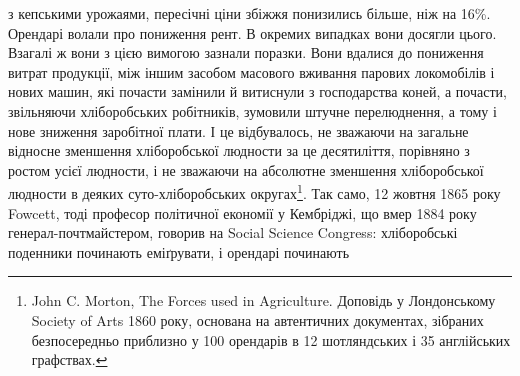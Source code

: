 з кепськими урожаями, пересічні ціни збіжжя понизились більше, ніж на 16\%.
Орендарі волали про пониження рент. В окремих випадках вони досягли цього.
Взагалі ж вони з цією вимогою зазнали поразки. Вони вдалися до пониження
витрат продукції, між іншим засобом масового вживання парових
локомобілів і нових машин, які почасти замінили й витиснули з господарства
коней, а почасти, звільняючи хліборобських робітників, зумовили
штучне перелюднення, а тому і нове зниження заробітної плати. І це відбувалось,
не зважаючи на загальне відносне зменшення хліборобської людности за це
десятиліття, порівняно з ростом усієї людности, і не зважаючи на абсолютне зменшення
хліборобської людности в деяких суто-хліборобських округах\footnote{
John C. Morton, The Forces used in Agriculture. Доповідь у Лондонському Society of Arts 1860
року, основана на автентичних документах, зібраних безпосередньо приблизно у 100 орендарів в 12
шотляндських і 35 англійських графствах.
}. Так
само, 12 жовтня 1865 року Fowcett, тоді професор політичної економії у Кембріджі,
що вмер 1884 року генерал-почтмайстером, говорив на Social Science
Congress: хліборобські поденники починають еміґрувати, і орендарі починають